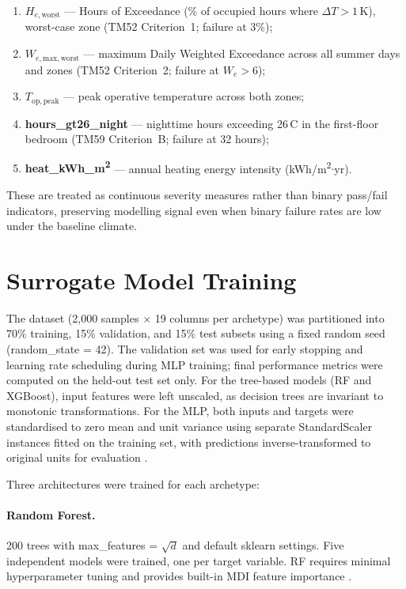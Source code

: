 \documentclass[12pt,a4paper]{report}
\begin{document}
\begin{enumerate}[label=(\roman*)]
    \item \textbf{$H_{e,\mathrm{worst}}$} --- Hours of Exceedance (\% of occupied hours where $\Delta T > 1$\,K), worst-case zone (TM52 Criterion~1; failure at 3\%);
    \item \textbf{$W_{e,\mathrm{max,worst}}$} --- maximum Daily Weighted Exceedance across all summer days and zones (TM52 Criterion~2; failure at $W_e > 6$);
    \item \textbf{$T_{\mathrm{op,peak}}$} --- peak operative temperature across both zones;
    \item \textbf{hours\_gt26\_night} --- nighttime hours exceeding 26\,\textdegree C in the first-floor bedroom (TM59 Criterion~B; failure at 32 hours);
    \item \textbf{heat\_kWh\_m\textsuperscript{2}} --- annual heating energy intensity (kWh/m\textsuperscript{2}$\cdot$yr).
\end{enumerate}

These are treated as continuous severity measures rather than binary pass/fail indicators, preserving modelling signal even when binary failure rates are low under the baseline climate.


\section{Surrogate Model Training}
\label{sec:training}

The dataset (2{,}000 samples $\times$ 19 columns per archetype) was partitioned into 70\% training, 15\% validation, and 15\% test subsets using a fixed random seed (random\_state = 42). The validation set was used for early stopping and learning rate scheduling during MLP training; final performance metrics were computed on the held-out test set only. For the tree-based models (RF and XGBoost), input features were left unscaled, as decision trees are invariant to monotonic transformations. For the MLP, both inputs and targets were standardised to zero mean and unit variance using separate StandardScaler instances fitted on the training set, with predictions inverse-transformed to original units for evaluation \citep{Lawrence2021,Hou2024}.

Three architectures were trained for each archetype:

\paragraph{Random Forest.} 200 trees with max\_features = $\sqrt{d}$ and default sklearn settings. Five independent models were trained, one per target variable. RF requires minimal hyperparameter tuning and provides built-in MDI feature importance \citep{Botti2022}.
\end{document}
